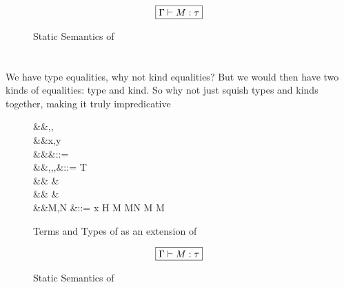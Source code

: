 \documentclass[manuscript,screen,nonacm]{acmart}
\begin{document}
\begin{figure}[ht]
  \centering
  \begin{gather*}
    \fbox{$\Gamma \vdash M : \tau$}
  \end{gather*}
  \caption{Static Semantics of \SFP}
  \label{fig:sfp-typing}
\end{figure}





\section{\SFK}\label{sec:sfk} %
We have type equalities, why not kind equalities?
But we would then have two kinds of equalities: type and kind.
So why not just squish types and kinds together, making it truly impredicative

\begin{figure}[ht]
  \centering
  \begin{syntax}
     &&\alpha,\beta,\gamma \\
     &&x,y          \\
         &&\kappa                  &::= \star \bnfor \kappa \to \kappa \bnfor \syntaxhl{\tau \sim \sigma}\\
         &&\tau,\sigma,\gamma,\nu  &::= \alpha \bnfor T \bnfor {} \bnfor \tau \to \tau \bnfor \Forall {\alpha\co\kappa} \tau\\
    &&                        &\syntaxhl{\bnfor \sym \Co \bnfor \trans \nu \Co \bnfor \Co\At\tau \bnfor \Left \Co \bnfor \Right \Co} \\
    &&                        &\syntaxhl{\bnfor \Cast \Co \Co}\\
         &&M,N                     &::= x \bnfor H \bnfor {} M \bnfor M\App N \bnfor \TLam{\tau\co\kappa} M \bnfor M\App \tau
  \end{syntax}
  \caption{Terms and Types of \SFK as an extension of \SFC}
  \label{fig:system-fck-syntax}
\end{figure}


\begin{figure}[ht]
  \centering
  \begin{gather*}
    \fbox{$\Gamma \vdash M : \tau$}
  \end{gather*}
  \caption{Static Semantics of \SFK}
  \label{fig:sfk-typing}
\end{figure}
\end{document}
